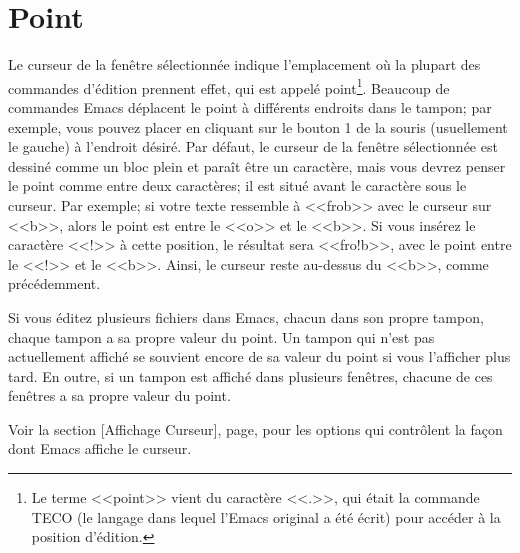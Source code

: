 \section{Point}
Le curseur de la fenêtre sélectionnée indique l'emplacement où la
plupart des commandes d'édition prennent effet, qui est appelé
point\footnote{Le terme <<point>> vient du caractère <<.>>, qui était la
  commande TECO (le langage dans lequel l'Emacs original a été
  écrit) pour accéder à la position d'édition.}. Beaucoup
de commandes Emacs déplacent le point à différents endroits dans le
tampon; par exemple, vous pouvez placer en cliquant sur le bouton 1 de
la souris (usuellement le gauche) à l'endroit désiré. Par défaut, le
curseur de la fenêtre sélectionnée est dessiné comme un bloc plein et
paraît être un caractère, mais vous devrez penser le point comme entre
deux caractères; il est situé avant le caractère sous le curseur. Par
exemple; si votre texte ressemble à <<frob>> avec le curseur sur <<b>>,
alors le point est entre le <<o>> et le <<b>>. Si vous insérez le
caractère <<!>> à cette position, le résultat sera <<fro!b>>, avec le
point entre le <<!>> et le <<b>>. Ainsi, le curseur reste au-dessus du
<<b>>, comme précédemment.\par 

Si vous éditez plusieurs fichiers dans Emacs, chacun dans son propre
tampon, chaque tampon a sa propre valeur du point. Un tampon qui n'est
pas actuellement affiché se souvient encore de sa valeur du point si vous
l'afficher plus tard. En outre, si un tampon est affiché dans
plusieurs fenêtres, chacune de ces fenêtres a sa propre valeur du
point.\par

Voir la section [Affichage Curseur],
page, pour les options qui contrôlent la façon
dont Emacs affiche le curseur.\par 

